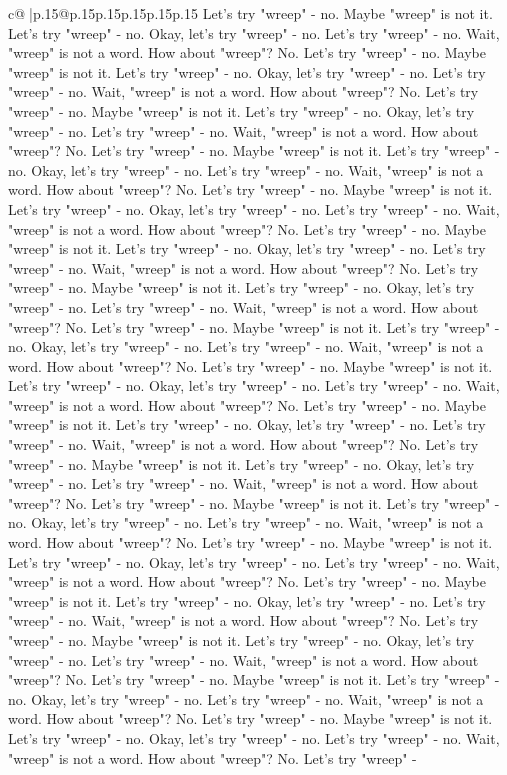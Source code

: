 \documentclass{article}
\begin{document}
{\begin{supertabular}{c@{$\;$}|p{.15\linewidth}@{}p{.15\linewidth}p{.15\linewidth}p{.15\linewidth}p{.15\linewidth}p{.15\linewidth}}
{{{Let's try "wreep" {-} no. Maybe "wreep" is not it. Let's try "wreep" {-} no. Okay, let's try "wreep" {-} no. Let's try "wreep" {-} no. Wait, "wreep" is not a word. How about "wreep"? No. Let's try "wreep" {-} no. Maybe "wreep" is not it. Let's try "wreep" {-} no. Okay, let's try "wreep" {-} no. Let's try "wreep" {-} no. Wait, "wreep" is not a word. How about "wreep"? No. Let's try "wreep" {-} no. Maybe "wreep" is not it. Let's try "wreep" {-} no. Okay, let's try "wreep" {-} no. Let's try "wreep" {-} no. Wait, "wreep" is not a word. How about "wreep"? No. Let's try "wreep" {-} no. Maybe "wreep" is not it. Let's try "wreep" {-} no. Okay, let's try "wreep" {-} no. Let's try "wreep" {-} no. Wait, "wreep" is not a word. How about "wreep"? No. Let's try "wreep" {-} no. Maybe "wreep" is not it. Let's try "wreep" {-} no. Okay, let's try "wreep" {-} no. Let's try "wreep" {-} no. Wait, "wreep" is not a word. How about "wreep"? No. Let's try "wreep" {-} no. Maybe "wreep" is not it. Let's try "wreep" {-} no. Okay, let's try "wreep" {-} no. Let's try "wreep" {-} no. Wait, "wreep" is not a word. How about "wreep"? No. Let's try "wreep" {-} no. Maybe "wreep" is not it. Let's try "wreep" {-} no. Okay, let's try "wreep" {-} no. Let's try "wreep" {-} no. Wait, "wreep" is not a word. How about "wreep"? No. Let's try "wreep" {-} no. Maybe "wreep" is not it. Let's try "wreep" {-} no. Okay, let's try "wreep" {-} no. Let's try "wreep" {-} no. Wait, "wreep" is not a word. How about "wreep"? No. Let's try "wreep" {-} no. Maybe "wreep" is not it. Let's try "wreep" {-} no. Okay, let's try "wreep" {-} no. Let's try "wreep" {-} no. Wait, "wreep" is not a word. How about "wreep"? No. Let's try "wreep" {-} no. Maybe "wreep" is not it. Let's try "wreep" {-} no. Okay, let's try "wreep" {-} no. Let's try "wreep" {-} no. Wait, "wreep" is not a word. How about "wreep"? No. Let's try "wreep" {-} no. Maybe "wreep" is not it. Let's try "wreep" {-} no. Okay, let's try "wreep" {-} no. Let's try "wreep" {-} no. Wait, "wreep" is not a word. How about "wreep"? No. Let's try "wreep" {-} no. Maybe "wreep" is not it. Let's try "wreep" {-} no. Okay, let's try "wreep" {-} no. Let's try "wreep" {-} no. Wait, "wreep" is not a word. How about "wreep"? No. Let's try "wreep" {-} no. Maybe "wreep" is not it. Let's try "wreep" {-} no. Okay, let's try "wreep" {-} no. Let's try "wreep" {-} no. Wait, "wreep" is not a word. How about "wreep"? No. Let's try "wreep" {-} no. Maybe "wreep" is not it. Let's try "wreep" {-} no. Okay, let's try "wreep" {-} no. Let's try "wreep" {-} no. Wait, "wreep" is not a word. How about "wreep"? No. Let's try "wreep" {-} no. Maybe "wreep" is not it. Let's try "wreep" {-} no. Okay, let's try "wreep" {-} no. Let's try "wreep" {-} no. Wait, "wreep" is not a word. How about "wreep"? No. Let's try "wreep" {-} no. Maybe "wreep" is not it. Let's try "wreep" {-} no. Okay, let's try "wreep" {-} no. Let's try "wreep" {-} no. Wait, "wreep" is not a word. How about "wreep"? No. Let's try "wreep" {-} no. Maybe "wreep" is not it. Let's try "wreep" {-} no. Okay, let's try "wreep" {-} no. Let's try "wreep" {-} no. Wait, "wreep" is not a word. How about "wreep"? No. Let's try "wreep" {-} }}}
\end{supertabular}}
\end{document}
